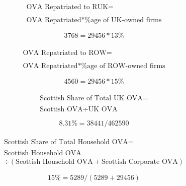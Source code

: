 \begin{enumerate}
\begin{equation}
\begin{split}
\text{OVA Repatriated to RUK} =  \\ \\
\text{OVA Repatriated}*\text{\%age of UK-owned firms} 
\end{split} \label{eq:2.5.80}
\end{equation}

\begin{equation} \nonumber
3768 = 29456*13\%
\end{equation}\\


\begin{equation}
\begin{split}
\text{OVA Repatriated to ROW} =  \\ \\
\text{OVA Repatriated}*\text{\%age of ROW-owned firms} 
\end{split} \label{eq:2.5.81}
\end{equation}

\begin{equation} \nonumber
4560 = 29456*15\%
\end{equation}\\


\begin{equation}
\begin{split}
\text{Scottish Share of Total UK OVA} =  \\ \\
\text{Scottish OVA}\div \text{UK OVA} 
\end{split} \label{eq:2.5.82}
\end{equation}

\begin{equation} \nonumber
8.31\% = 38441/462590
\end{equation}\\


\begin{equation}
\begin{split}
\text{Scottish Share of Total Household OVA} =  \\ \\
\text{Scottish Household OVA}\\ 
\div (\text{Scottish Household OVA}+ \text{Scottish Corporate OVA}) 
\end{split} \label{eq:2.5.83}
\end{equation}

\begin{equation} \nonumber
15\% = 5289/(5289+29456)
\end{equation}\\



\end{enumerate}

